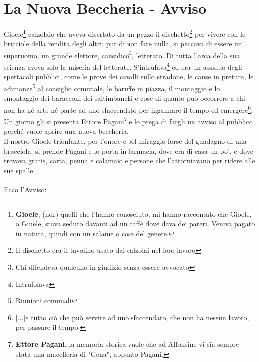 
\chapter{La Nuova Beccheria - Avviso}
Gioele\footnote{\textbf{Gioele}, (ndr) quelli che l'hanno conosciuto, mi hanno raccontato che Gioele, o Giuele, stava seduto davanti ad un caffè dove dava dei pareri. Veniva pagato in natura, quindi con un salame o cose del genere.} calzolaio che aveva disertato da un pezzo il dischetto\footnote{Il dischetto era il tavolino usato dai calzolai nel loro lavoro} per vivere con le bricciole della rendita degli altri: pur di non fare nulla, si peccava di essere un superuomo, un grande elettore, causidico\footnote{Chi difendeva qualcuno in giudizio senza essere avvocato}, letterato. Di tutta l'arca della sua scienza aveva solo la miseria del letterato. S'intrufava\footnote{Intrufolava} ed era un assiduo degli spettacoli pubblici, come le prove dei cavalli sullo stradone, le cause in pretura, le adunanze\footnote{Riunioni comunali} al consiglio comunale, le baruffe in piazza, il montaggio e lo smontaggio dei baracconi dei saltimbanchi e cose di quanto può occorrere a chi non ha né arte né parte ad uno sfaccendato per ingannare il tempo ed emergere\footnote{[...]e tutto ciò che può servire ad uno sfaccendato, che non ha nessun lavoro, per passare il tempo.}.\\
\indent Un giorno gli si presenta Ettore Pagani\footnote{\textbf{Ettore Pagani}, la memoria storica vuole che ad Alfonsine vi sia sempre stata una macelleria di "Gena", appunto Pagani.} e lo prega di fargli un avviso al pubblico perché vuole aprire una nuova beccheria. \\
\indent Il nostro Gioele trionfante, per l'onore e col miraggio forse del guadagno di una bracciola, si prende Pagani e lo porta in farmacia, dove era di casa un po', e dove trovava gratis, carta, penna e calamaio e persone che l'attorniavano per ridere alle sue spalle.\\
\\
\indent Ecco l'Avviso:

 \normalsize \normalfont 

